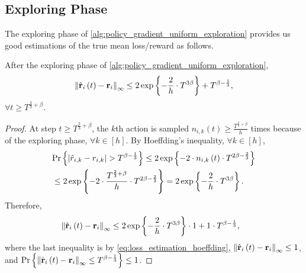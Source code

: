 \subsection{Exploring Phase}
\label{subsec:exploring_phase}

The exploring phase of \cref{alg:policy_gradient_uniform_exploration} provides us good estimations of the true mean loss/reward as follows.
\begin{thm}
\label{thm:loss_estimation_hoeffding}
    After the exploring phase of \cref{alg:policy_gradient_uniform_exploration},
\begin{equation*}
    \left\| \hat{{\mathbf{r}}}_i\left(t\right) - {\mathbf{r}}_i \right\|_\infty \le 2 \exp\left\{ - \frac{2}{h} \cdot  T^{3\beta} \right\} + T^{\beta - \frac{1}{3}},
\end{equation*}
$\forall t \ge T^{\frac{2}{3} + \beta}$.
\end{thm}
\begin{proof}
    At step $t \ge T^{\frac{2}{3} + \beta}$, the $k$th action is sampled $n_{i, k}\left(t\right) \ge \frac{T^{\frac{2}{3} + \beta} }{h}$ times because of the exploring phase, $\forall k \in [h]$. By Hoeffding's inequality, $\forall k \in [h]$,
\begin{equation}
\label{eq:loss_estimation_hoeffding}
\begin{split}
    &{\text{Pr}}\left\{ \left| \hat{r}_{i, k} - r_{i,k} \right| > T^{\beta - \frac{1}{3}} \right\} \le 2 \exp\left\{ - 2 \cdot  n_{i, k}\left(t\right) \cdot T^{2\beta - \frac{2}{3}} \right\} \\
    &\le 2 \exp\left\{ - 2 \cdot  \frac{T^{\frac{2}{3} + \beta}}{h} \cdot T^{2\beta - \frac{2}{3}} \right\} = 2 \exp\left\{ - \frac{2}{h} \cdot  T^{3\beta} \right\}.
\end{split}
\end{equation}
Therefore,
\begin{equation*}
\begin{split}
    &\left\| \hat{{\mathbf{r}}}_i\left(t\right) - {\mathbf{r}}_i \right\|_\infty \le 2 \exp\left\{ - \frac{2}{h} \cdot  T^{3\beta} \right\} \cdot 1 + 1 \cdot T^{\beta - \frac{1}{3}},
\end{split}
\end{equation*}
where the last inequality is by \cref{eq:loss_estimation_hoeffding}, $\left\| \hat{{\mathbf{r}}}_i\left(t\right) - {\mathbf{r}}_i \right\|_\infty \le 1$, and ${\text{Pr}}\left\{ \left\| \hat{{\mathbf{r}}}_i\left(t\right) - {\mathbf{r}}_i \right\|_\infty \le T^{\beta - \frac{1}{3}} \right\} \le 1$. 
\end{proof}

